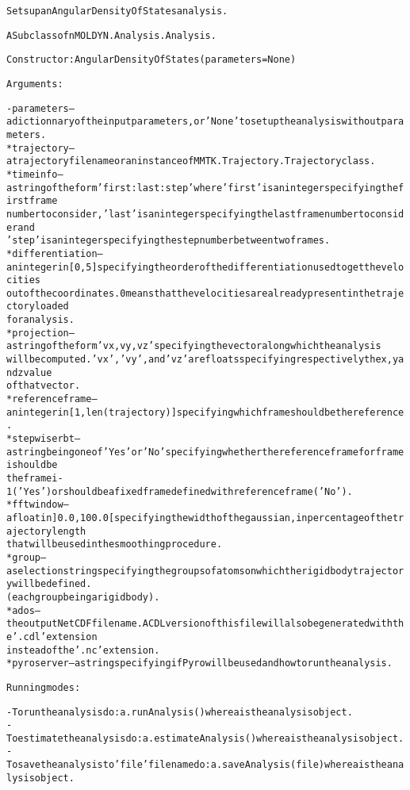 \begin{alltt}
Sets up an Angular Density Of States analysis.

A Subclass of nMOLDYN.Analysis.Analysis. 

Constructor: AngularDensityOfStates({\textbar}parameters{\textbar} = None)

Arguments:

    - {\textbar}parameters{\textbar} -- a dictionnary of the input parameters, or 'None' to set up the analysis without parameters.
        * trajectory      -- a trajectory file name or an instance of MMTK.Trajectory.Trajectory class.
        * timeinfo        -- a string of the form 'first:last:step' where 'first' is an integer specifying the first frame 
                             number to consider, 'last' is an integer specifying the last frame number to consider and 
                             'step' is an integer specifying the step number between two frames.
        * differentiation -- an integer in [0,5] specifying the order of the differentiation used to get the velocities
                             out of the coordinates. 0 means that the velocities are already present in the trajectory loaded
                             for analysis.
        * projection      -- a string of the form 'vx,vy,vz' specifying the vector along which the analysis
                             will be computed. 'vx', 'vy', and 'vz' are floats specifying respectively the x, y and z value 
                             of that vector.
        * referenceframe  -- an integer in [1,len(trajectory)] specifying which frame should be the reference.
        * stepwiserbt     -- a string being one of 'Yes' or 'No' specifying whether the reference frame for frame i should be 
                             the frame i - 1 ('Yes') or should be a fixed frame defined with {\textbar}referenceframe{\textbar} ('No').
        * fftwindow       -- a float in ]0.0,100.0[ specifying the width of the gaussian, in percentage of the trajectory length
                             that will be used in the smoothing procedure.
        * group           -- a selection string specifying the groups of atoms on which the rigid body trajectory will be defined.
                             (each group being a rigid body).
        * ados            -- the output NetCDF file name. A CDL version of this file will also be generated with the '.cdl' extension
                             instead of the '.nc' extension.
        * pyroserver      -- a string specifying if Pyro will be used and how to run the analysis.
    
Running modes:

    - To run the analysis do: a.runAnalysis() where a is the analysis object.
    - To estimate the analysis do: a.estimateAnalysis() where a is the analysis object.
    - To save the analysis to 'file' file name do: a.saveAnalysis(file) where a is the analysis object.
\end{alltt}


